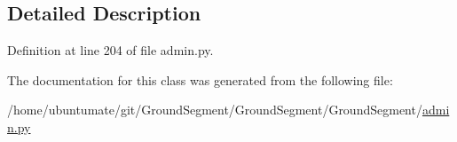 \subsection{Detailed Description}


Definition at line 204 of file admin.\+py.



The documentation for this class was generated from the following file\+:\begin{DoxyCompactItemize}
\item 
/home/ubuntumate/git/\+Ground\+Segment/\+Ground\+Segment/\+Ground\+Segment/\hyperlink{admin_8py}{admin.\+py}\end{DoxyCompactItemize}
